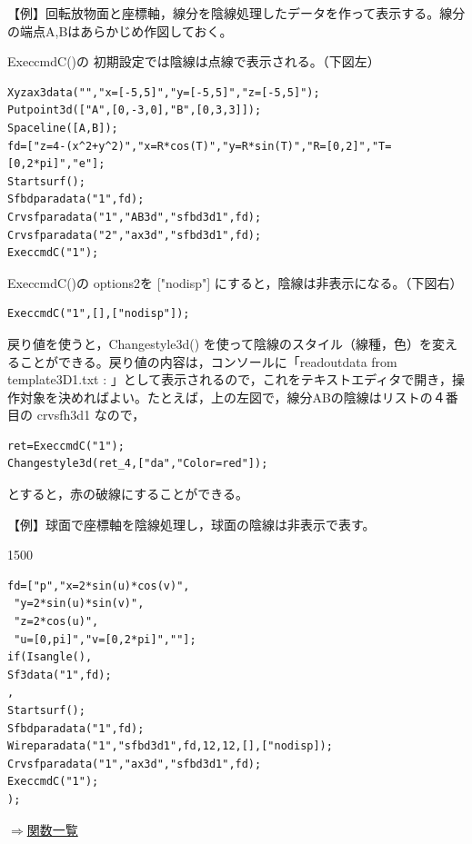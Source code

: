\documentclass[papersize,a4paper,12pt,uplatex]{jsarticle}
\begin{document}
\begin{description}
【例】回転放物面と座標軸，線分を陰線処理したデータを作って表示する。線分の端点A,Bはあらかじめ作図しておく。

ExeccmdC()の 初期設定では陰線は点線で表示される。（下図左）
\begin{verbatim}
Xyzax3data("","x=[-5,5]","y=[-5,5]","z=[-5,5]");
Putpoint3d(["A",[0,-3,0],"B",[0,3,3]]);
Spaceline([A,B]);
fd=["z=4-(x^2+y^2)","x=R*cos(T)","y=R*sin(T)","R=[0,2]","T=[0,2*pi]","e"];
Startsurf();
Sfbdparadata("1",fd);
Crvsfparadata("1","AB3d","sfbd3d1",fd);
Crvsfparadata("2","ax3d","sfbd3d1",fd);
ExeccmdC("1");
\end{verbatim}
ExeccmdC()の options2を ["nodisp"] にすると，陰線は非表示になる。（下図右）
\begin{verbatim}
ExeccmdC("1",[],["nodisp"]);
\end{verbatim}

\begin{center}\scalebox{0.9}{ }\hspace{5mm} \scalebox{0.9}{} \end{center}

戻り値を使うと，Changestyle3d() を使って陰線のスタイル（線種，色）を変えることができる。戻り値の内容は，コンソールに「readoutdata from template3D1.txt : 」として表示されるので，これをテキストエディタで開き，操作対象を決めればよい。たとえば，上の左図で，線分ABの陰線はリストの４番目の crvsfh3d1 なので，

\begin{verbatim}
ret=ExeccmdC("1");
Changestyle3d(ret_4,["da","Color=red"]);
\end{verbatim}

とすると，赤の破線にすることができる。

【例】球面で座標軸を陰線処理し，球面の陰線は非表示で表す。

\begin{layer}{150}{0}
\end{layer}

\begin{verbatim}
fd=["p","x=2*sin(u)*cos(v)",
 "y=2*sin(u)*sin(v)",
 "z=2*cos(u)",
 "u=[0,pi]","v=[0,2*pi]",""];
if(Isangle(),
Sf3data("1",fd);
,
Startsurf();
Sfbdparadata("1",fd);
Wireparadata("1","sfbd3d1",fd,12,12,[],["nodisp]);
Crvsfparadata("1","ax3d","sfbd3d1",fd);
ExeccmdC("1");
);
\end{verbatim}

\begin{flushright} \hyperlink{functionlist}{$\Rightarrow$関数一覧}\end{flushright}

\end{description}
\end{document}
